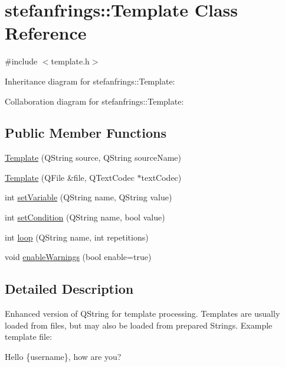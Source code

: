 \hypertarget{classstefanfrings_1_1_template}{}\section{stefanfrings\+:\+:Template Class Reference}
\label{classstefanfrings_1_1_template}


{\ttfamily \#include $<$template.\+h$>$}



Inheritance diagram for stefanfrings\+:\+:Template\+:


Collaboration diagram for stefanfrings\+:\+:Template\+:
\subsection*{Public Member Functions}
\begin{DoxyCompactItemize}
\item 
\mbox{\hyperlink{classstefanfrings_1_1_template_a2789cca9bf2ed506cbf36ee21614c96f}{Template}} (Q\+String source, Q\+String source\+Name)
\item 
\mbox{\hyperlink{classstefanfrings_1_1_template_a43eee8fe07463d0af6aeb8db3ebd8174}{Template}} (Q\+File \&file, Q\+Text\+Codec $\ast$text\+Codec)
\item 
int \mbox{\hyperlink{classstefanfrings_1_1_template_abd87f7c267c6e047b5db8c0d50c2eea4}{set\+Variable}} (Q\+String name, Q\+String value)
\item 
int \mbox{\hyperlink{classstefanfrings_1_1_template_a68bfaf8f993d7942107cb2eb0dab9e7b}{set\+Condition}} (Q\+String name, bool value)
\item 
int \mbox{\hyperlink{classstefanfrings_1_1_template_a9d8bcef23c0d34b0947ea0270be5b137}{loop}} (Q\+String name, int repetitions)
\item 
void \mbox{\hyperlink{classstefanfrings_1_1_template_a6a73920ab66ab718d8c2d0dec62cb4d8}{enable\+Warnings}} (bool enable=true)
\end{DoxyCompactItemize}


\subsection{Detailed Description}
Enhanced version of Q\+String for template processing. Templates are usually loaded from files, but may also be loaded from prepared Strings. Example template file\+: 

{\ttfamily 
\begin{DoxyPre}
Hello \{username\}, how are you?\end{DoxyPre}
}

